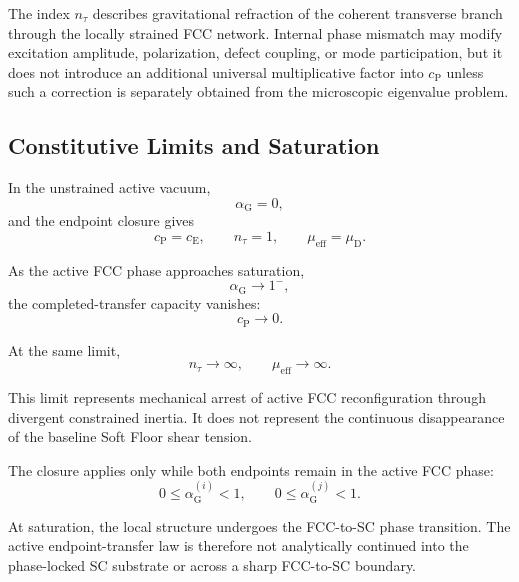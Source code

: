 The index $n_{\tau}$ describes gravitational refraction of the coherent transverse branch through the locally strained FCC network. Internal phase mismatch may modify excitation amplitude, polarization, defect coupling, or mode participation, but it does not introduce an additional universal multiplicative factor into $c_{\mathrm{P}}$ unless such a correction is separately obtained from the microscopic eigenvalue problem.

\subsection{Constitutive Limits and Saturation}

In the unstrained active vacuum,
\begin{equation}
    \alpha_{\mathrm{G}} = 0,
\end{equation}
and the endpoint closure gives
\begin{equation}
    c_{\mathrm{P}} = c_{\mathrm{E}}, \qquad n_{\tau} = 1, \qquad \mu_{\mathrm{eff}} = \mu_{\mathrm{D}}.
\end{equation}

As the active FCC phase approaches saturation,
\begin{equation}
    \alpha_{\mathrm{G}} \rightarrow 1^{-},
\end{equation}
the completed-transfer capacity vanishes:
\begin{equation}
    c_{\mathrm{P}} \rightarrow 0.
\end{equation}

At the same limit,
\begin{equation}
    n_{\tau} \rightarrow \infty, \qquad \mu_{\mathrm{eff}} \rightarrow \infty.
\end{equation}

This limit represents mechanical arrest of active FCC reconfiguration through divergent constrained inertia. It does not represent the continuous disappearance of the baseline Soft Floor shear tension.

The closure applies only while both endpoints remain in the active FCC phase:
\begin{equation}
    0 \leq \alpha_{\mathrm{G}}^{(i)} < 1, \qquad 0 \leq \alpha_{\mathrm{G}}^{(j)} < 1.
\end{equation}

At saturation, the local structure undergoes the FCC-to-SC phase transition. The active endpoint-transfer law is therefore not analytically continued into the phase-locked SC substrate or across a sharp FCC-to-SC boundary.


